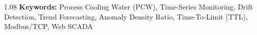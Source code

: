 \documentclass[fontset=none, a4paper, 12pt]{ctexart}
\begin{document}
\begin{spacing}{1.08}
\vspace{0.4em}
\noindent \textbf{Keywords:} Process Cooling Water (PCW), Time-Series Monitoring, Drift Detection, Trend Forecasting, Anomaly Density Ratio, Time-To-Limit (TTL), Modbus/TCP, Web SCADA
\end{spacing}

\newpage

{}
\tableofcontents
\newpage

{}
\listoftables
\newpage

{}
\listoffigures
\newpage

\clearpage
{}
\setcounter{page}{1}
\end{document}
